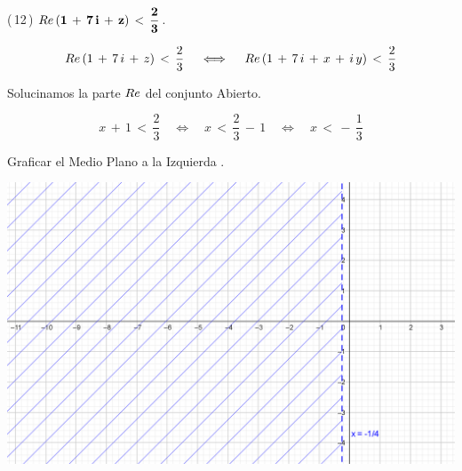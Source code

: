 \documentclass[a4paper,11pt,openany]{book}
\begin{document}
\textcolor{ao(english)}{(\,12\,)} $\bf{\mathnormal{Re}\,(1\,+\,7\,i\,+\,z)\,<\,\dfrac{2}{3}}$.

$$\mathnormal{Re}\,(1\,+\,7\,i\,+\,z)\,<\,\dfrac{2}{3} \quad\iff\quad \mathnormal{Re}\,(1\,+\,7\,i\,+\,x\,+\,i\,y)\,<\,\dfrac{2}{3}$$

\textcolor{ao(english)}{} Solucinamos la parte $\mathnormal{Re}$ del conjunto Abierto.

$$x\,+\,1\,<\,\dfrac{2}{3} \quad\iff\quad x\,<\,\dfrac{2}{3}\,-\,1 \quad\iff\quad x\,<\,-\,\dfrac{1}{3}$$

\textcolor{ao(english)}{} Graficar el Medio Plano a la Izquierda .

\begin{center}
    \includegraphics[width=15cm]{Gra-Ej-12.png}
\end{center}
\end{document}
